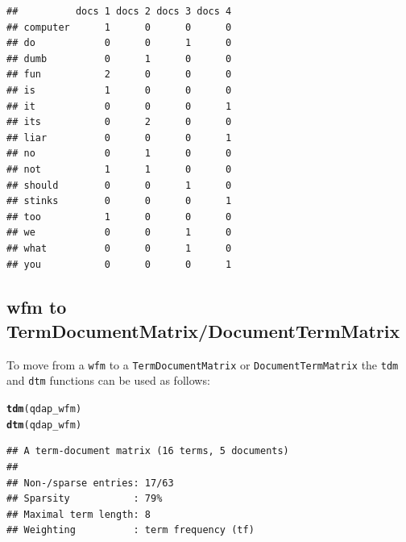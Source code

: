 \documentclass{article}\usepackage[]{graphicx}\usepackage[]{color}
\makeatletter
\newcommand{\hlstd}[1]{\textcolor[rgb]{0.345,0.345,0.345}{#1}}%
\newcommand{\hlkwd}[1]{\textcolor[rgb]{0.737,0.353,0.396}{\textbf{#1}}}%
\newenvironment{kframe}{%
 \def\at@end@of@kframe{}%
 \ifinner\ifhmode%
  \def\at@end@of@kframe{\end{minipage}}%
  \begin{minipage}{\columnwidth}%
 \fi\fi%
 \def\FrameCommand##1{\hskip\@totalleftmargin \hskip-\fboxsep
 \colorbox{shadecolor}{##1}\hskip-\fboxsep
     \hskip-\linewidth \hskip-\@totalleftmargin \hskip\columnwidth}%
 \MakeFramed {\advance\hsize-\width
   \@totalleftmargin\z@ \linewidth\hsize
   \@setminipage}}%
 {\par\unskip\endMakeFramed%
 \at@end@of@kframe}
\newenvironment{knitrout}{}{} %
\makeatother
\begin{document}
\begin{knitrout}
\color{fgcolor}\begin{kframe}
\begin{verbatim}
##          docs 1 docs 2 docs 3 docs 4
## computer      1      0      0      0
## do            0      0      1      0
## dumb          0      1      0      0
## fun           2      0      0      0
## is            1      0      0      0
## it            0      0      0      1
## its           0      2      0      0
## liar          0      0      0      1
## no            0      1      0      0
## not           1      1      0      0
## should        0      0      1      0
## stinks        0      0      0      1
## too           1      0      0      0
## we            0      0      1      0
## what          0      0      1      0
## you           0      0      0      1
\end{verbatim}
\end{kframe}
\end{knitrout}



\subsection{wfm to TermDocumentMatrix/DocumentTermMatrix}

\hspace{.4cm} To move from a \texttt{wfm} to a \texttt{TermDocumentMatrix} or \texttt{DocumentTermMatrix} the \texttt{tdm} and \texttt{dtm} functions can be used as follows:

\begin{knitrout}
\color{fgcolor}\begin{kframe}
\begin{alltt}
\hlkwd{tdm}\hlstd{(qdap_wfm)}
\hlkwd{dtm}\hlstd{(qdap_wfm)}
\end{alltt}
\end{kframe}
\end{knitrout}


\begin{knitrout}
\color{fgcolor}\begin{kframe}
\begin{verbatim}
## A term-document matrix (16 terms, 5 documents)
## 
## Non-/sparse entries: 17/63
## Sparsity           : 79%
## Maximal term length: 8 
## Weighting          : term frequency (tf)
\end{verbatim}
\end{kframe}
\end{knitrout}
\end{document}
